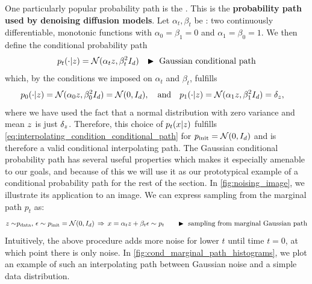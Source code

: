 \begin{examplebox}
\label{example:gaussian_path}
    One particularly popular probability path is the . This is the \textbf{probability path used by denoising diffusion models}. Let $\alpha_t,\beta_t$ be : two continuously differentiable, monotonic functions with $\alpha_0=\beta_1=0$ and $\alpha_1=\beta_0=1$. We then define the conditional probability path
\begin{align}
\label{eq:gaussian_conditional_probability_paths}
p_t(\cdot|z) &= \mathcal{N}(\alpha_t z,\beta_t^2 I_d)
& \blacktriangleright \,\, \text{Gaussian conditional path}
\end{align}
which, by the conditions we imposed on $\alpha_t$ and $\beta_t$, fulfills
\begin{align*}
    p_0(\cdot|z) &= \mathcal{N}(\alpha_0 z,\beta_0^2 I_d) = \mathcal{N}(0,I_d),\quad \text{and}\quad
p_1(\cdot|z) = \mathcal{N}(\alpha_1 z,\beta_1^2 I_d) = \delta_{z},
\end{align*}
where we have used the fact that a normal distribution with zero variance and mean $z$ is just $\delta_{z}$. Therefore, this choice of $p_t(x|z)$ fulfills \cref{eq:interpolating_condition_conditional_path} for $p_{\rm{init}}=\mathcal{N}(0,I_d)$ and is therefore a valid conditional interpolating path. The Gaussian conditional probability path has several useful properties which makes it especially amenable to our goals, and because of this we will use it as our prototypical example of a conditional probability path for the rest of the section. In \cref{fig:noising_image}, we illustrate its application to an image. We can express sampling from the marginal path $p_t$ as: 
\begin{align}
    \label{eq:gaussian_prob_path_sampling}
    z\sim&p_{\rm{data}},\,\epsilon\sim p_{\rm{init}} = \mathcal{N}(0,I_d) \,\Rightarrow\, x=\alpha_tz+\beta_t \epsilon\sim p_t \quad &\blacktriangleright \,\,\text{sampling from marginal Gaussian path}
\end{align}
Intuitively, the above procedure adds more noise for lower $t$ until time $t=0$, at which point there is only noise. In \cref{fig:cond_marginal_path_histograms}, we plot an example of such an interpolating path between Gaussian noise and a simple data distribution.
\end{examplebox}

